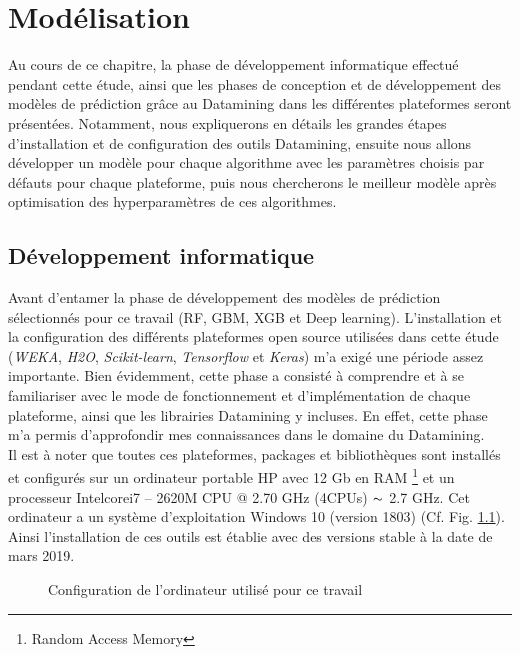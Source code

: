 \chapter[Modélisation]{Modélisation}
\label{Modelisation}

\chapterabstract
{
Au cours de ce chapitre, la phase de développement informatique effectué pendant cette étude, ainsi que les phases de conception et de développement des modèles de prédiction grâce au Datamining dans les différentes plateformes seront présentées. Notamment, nous expliquerons en détails les grandes étapes d'installation et de configuration des outils Datamining, ensuite nous allons développer un modèle pour chaque algorithme avec les paramètres choisis par défauts pour chaque plateforme, puis nous chercherons le meilleur modèle après optimisation des hyperparamètres de ces algorithmes.
}
\pagestyle{plain}

\section{Développement informatique}\label{conf_plat}
Avant d'entamer la phase de développement des modèles de prédiction sélectionnés pour ce travail (RF, GBM, XGB et Deep learning). L'installation et la configuration des différents plateformes open source utilisées dans cette étude (\textit{WEKA}, \textit{H2O}, \textit{Scikit-learn}, \textit{Tensorflow} et \textit{Keras}) m'a exigé une période assez importante. Bien évidemment, cette phase a consisté à comprendre et à se familiariser avec le mode de fonctionnement et d’implémentation de chaque plateforme, ainsi que les librairies Datamining y incluses. En effet, cette phase m'a permis d'approfondir mes connaissances dans le domaine du  Datamining.\\

Il est à noter que toutes ces plateformes, packages et bibliothèques sont installés et configurés sur un ordinateur portable HP avec 12 Gb en RAM \footnote { Random Access Memory} et un processeur Intel\textregistered core\texttrademark i7 – 2620M CPU @ 2.70 GHz (4CPUs) $\thicksim$ 2.7 GHz. Cet ordinateur a un système d'exploitation Windows 10 (version 1803) (Cf. Fig. \ref{pc_config}). Ainsi l'installation de ces outils est établie avec des versions stable à la date de mars 2019.\\

\begin{figure}[!htb]
        \caption{\label{fig:my-label} Configuration de l'ordinateur utilisé pour ce travail}
        \label{pc_config}
\end{figure}


